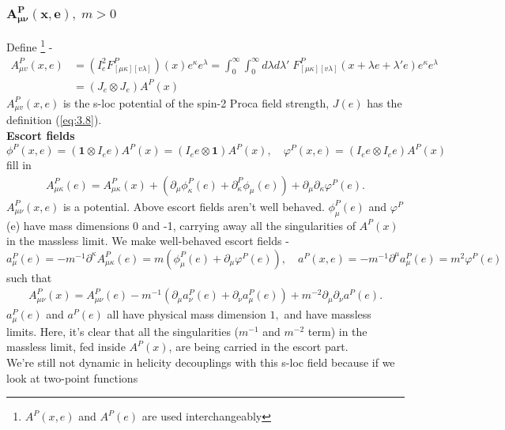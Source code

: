 \documentclass[12pt,a4paper]{article}
\numberwithin{equation}{section}
\begin{document}
\subsubsection{$\boldsymbol{A^P_{\mu\nu}(x,e)},\;m>0$}
Define \footnote{$A^P(x,e)$ and $A^P(e)$ are used interchangeably} - 
\begin{align}
A^P_{\mu v}(x, e)&=\left(I_{e}^{2} F^P_{[\mu \kappa][v \lambda]}\right)(x) e^{\kappa} e^{\lambda}=\int_{0}^{\infty}\int_{0}^{\infty} d \lambda d \lambda '\; F^P_{[\mu \kappa][v \lambda]}(x+\lambda e+\lambda 'e) e^{\kappa}e^\lambda\\&=\left(J_{e} \otimes J_{e}\right) A^{P}(x) 
\end{align}  
$A^P_{\mu v}(x, e)$ is the s-loc potential of the spin-2 Proca field strength, $J(e)$ has the definition (\ref{eq:3.8}). \\
\textbf{\textcolor{blue!50!black}{Escort fields} }
$$
\phi^P(x, e)=\left(\mathbf{1} \otimes I_{e} e\right) A^{P}(x)=\left(I_{e} e \otimes \mathbf{1}\right) A^{P}(x), \quad \varphi^P(x, e)=\left(I_{e} e \otimes I_{e} e\right) A^{P}(x)
$$
fill in 
\begin{align}\label{eq:3.11}
A^P_{\mu \kappa}(e)=A_{\mu \kappa}^{P}(x)+\left(\partial_{\mu} \phi^P_{\kappa}(e)+\partial^P_{\kappa} \phi_{\mu}(e)\right)+\partial_{\mu} \partial_{\kappa} \varphi^P(e).
\end{align}
$A^P_{\mu\nu}(x,e)$ is a potential. Above escort fields aren't well behaved. $\phi^P_{\mu}(e)$ and $\varphi^P$(e) have mass dimensions 0 and -1, carrying away all the singularities of $A^P(x)$ in the massless limit. 
We make well-behaved escort fields - 
$$
a^P_{\mu}(e)=-m^{-1} \partial^{\kappa} A^P_{\mu \kappa}(e)=m\left(\phi^P_{\mu}(e)+\partial_{\mu} \varphi^P(e)\right), \quad a^P(x, e)=-m^{-1} \partial^{\mu} a^P_{\mu}(e)=m^{2} \varphi^P(e)
$$
such that
\begin{align}
A_{\mu \nu}^{P}(x)=A^P_{\mu \nu}(e)-m^{-1}\left(\partial_{\mu} a^P_{\nu}(e)+\partial_{\nu} a^P_{\mu}(e)\right)+m^{-2} \partial_{\mu} \partial_{\nu} a^P(e).
\end{align}
$a^P_{\mu}(e)$ and $a^P(e)$ all have physical mass dimension $1,$ and have massless limits. Here, it's clear that all the singularities ($m^{-1}$ and $m^{-2}$ term) in the massless limit, fed inside $A^P(x)$, are being carried in the escort part.   \\
We're still not dynamic in helicity decouplings with this s-loc field because if we look at two-point functions 
\end{document}
